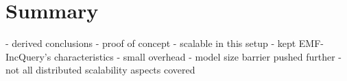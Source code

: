 \section{Summary}

  - derived conclusions
    - proof of concept
    - scalable in this setup
    - kept EMF-IncQuery's characteristics
    - small overhead
    - model size barrier pushed further
    - not all distributed scalability aspects covered